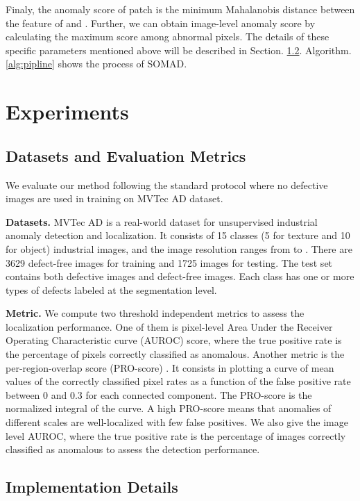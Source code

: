\documentclass{article}
\begin{document}
Finaly, the anomaly score  of patch  is the minimum Mahalanobis distance between the feature of  and  . 
Further, we can obtain image-level anomaly score by calculating the maximum score among abnormal pixels. The details of these specific parameters mentioned above will be described in Section. \ref{detail}. Algorithm. \ref{alg:pipline} shows the process of SOMAD.

\section{Experiments}
\label{sec:experiments}

\subsection{Datasets and Evaluation Metrics}
\label{dataset_metrics}
We evaluate our method following the standard protocol where no defective images are used in training on MVTec AD dataset.

\textbf{Datasets.}
MVTec AD \cite{MvtecAD} is a real-world dataset for unsupervised industrial anomaly detection and localization. It consists of 15 classes (5 for texture and 10 for object) industrial images, and the image resolution ranges from  to . There are 3629 defect-free images for training and 1725 images for testing. 
The test set contains both defective images and defect-free images. Each class has one or more types of defects labeled at the segmentation level. 

\textbf{Metric.}
We compute two threshold independent metrics to assess the localization performance. One of them is pixel-level Area Under the Receiver Operating Characteristic curve (AUROC) score, where the true positive rate is the percentage of pixels correctly classified as anomalous. Another metric is the per-region-overlap score (PRO-score) \cite{Student}. It consists in plotting a curve of mean values of the correctly classified pixel rates as a function of the false positive rate between 0 and 0.3 for each connected component. The PRO-score is the normalized integral of the curve. A high PRO-score means that anomalies of different scales are well-localized with few false positives. We also give the image level AUROC, where the true positive rate is the percentage of images correctly classified as anomalous to assess the detection performance.

\subsection{Implementation Details}
\label{detail}
\end{document}
